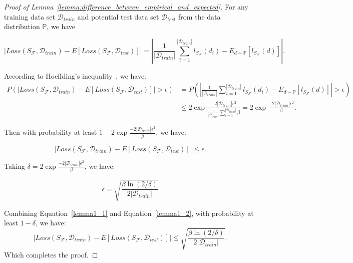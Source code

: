 \documentclass{article}
\theoremstyle{plain}
\theoremstyle{definition}
\theoremstyle{remark}
\begin{document}
\begin{proof}[Proof of Lemma~\ref{lemma:difference_between_empirical_and_expected}]

For any training data set $\mathcal{D}_{train}$ and potential test data set $\mathcal{D}_{test}$ from the data distribution \(\mathbb{P}\), we have

\begin{equation}
|Loss(S_{\mathcal{F}}, \mathcal{D}_{train}) - E[Loss(S_{\mathcal{F}}, \mathcal{D}_{test})] | = |\frac{1}{|\mathcal{D}_{train}|}\sum_{i=1}^{|\mathcal{D}_{train}|}l_{S_{\mathcal{F}}}(d_{i}) - E_{d \sim \mathbb{P}}[l_{S_{\mathcal{F}}}(d)]|.
\end{equation}  

According to Hoeffding’s inequality~\cite{hoeffding1994probability}, we have:
\begin{align}
\label{bound_sup_0}
P(|Loss(S_{\mathcal{F}}, \mathcal{D}_{train}) - E[Loss(S_{\mathcal{F}}, \mathcal{D}_{test})] |> \epsilon ) &= P(|\frac{1}{|\mathcal{D}_{train}|}\sum_{i=1}^{|\mathcal{D}_{train}|}l_{S_{\mathcal{F}}}(d_{i}) - E_{d \sim \mathbb{P}}[l_{S_{\mathcal{F}}}(d)]| > \epsilon) \\ \nonumber
& \leq 2\exp{\frac{-2|\mathcal{D}_{train}| \epsilon^2}{\frac{1}{|\mathcal{D}_{train}|}\sum_{i=1}^{|\mathcal{D}_{train}|} \beta}} = 2\exp{\frac{-2|\mathcal{D}_{train}| \epsilon^2}{\beta}}. 
\end{align}

Then with probability at least \(1- 2\exp{\frac{-2|\mathcal{D}_{train}| \epsilon^2}{\beta}}\), we have:

\begin{equation}\label{lemma1_1}
|Loss(S_{\mathcal{F}}, \mathcal{D}_{train}) - E[Loss(S_{\mathcal{F}}, \mathcal{D}_{test})] | \leq  \epsilon .
\end{equation}  

Taking $\delta = 2\exp{\frac{-2|\mathcal{D}_{train}| \epsilon^2}{\beta}}$, we have:

\begin{equation}\label{lemma1_2}
\epsilon = \sqrt{\frac{\beta \ln (2/\delta) }{2|\mathcal{D}_{train}|}}
\end{equation}  

Combining Equation~\ref{lemma1_1} and Equation~\ref{lemma1_2}, with probability at least $1-\delta$, we have:
\begin{equation}
|Loss(S_{\mathcal{F}}, \mathcal{D}_{train}) - E[Loss(S_{\mathcal{F}}, \mathcal{D}_{test})] | \leq  \sqrt{\frac{\beta \ln (2/\delta) }{2|\mathcal{D}_{train}|}}.
\end{equation}
Which completes the proof.
\end{proof}
\end{document}
